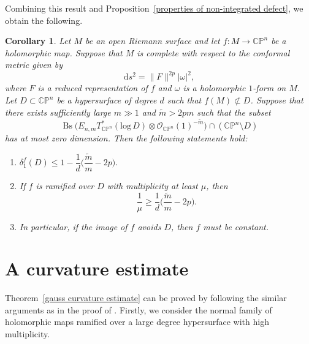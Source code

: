 \documentclass[english, 12pt]{amsart}
\DeclareMathOperator{\bs}{Bs}
\def\log{\mathrm{log}\,}
\theoremstyle{plain}
\newtheorem{cor}[thm]{{Corollary}}
\theoremstyle{remark}
\numberwithin{equation}{section}
\theoremstyle{plain}
\theoremstyle{named}
\begin{document}
Combining this result and Proposition~\ref{properties of non-integrated defect}, we obtain the following.
\begin{cor}
	\label{ramification gauss map}
	Let $M$ be an open Riemann surface and let $f\colon M\rightarrow\mathbb{CP}^n$ be a holomorphic map. Suppose that $M$ is complete with respect to  the conformal metric given by
	\[
	\mathrm{d}s^2=\|F\|^{2p}|\omega|^2,
	\]
	where $F$ is a reduced representation of $f$ and $\omega$ is a holomorphic $1$-form on $M$. Let $D\subset \mathbb{CP}^n$ be a hypersurface of degree $d$ such that $f(M)\not\subset D$.  Suppose that there exists sufficiently large $m\gg 1$ and $\tilde{m}>2pm$ such that the subset
	\[
	\bs	\big(
	E_{n,m}T_{\mathbb{C}\mathbb{P}^n}^*(\log D)
	\otimes
	\mathcal{O}_{\mathbb{C}\mathbb{P}^n}(1)^{-\widetilde{m}}
	\big)\cap \left(\mathbb{C}\mathbb{P}^n\setminus D\right)
	\]
	has at most zero dimension. Then the following statements hold:
	\begin{enumerate}
		\item $	\delta_1^f(D)\leq 1-\dfrac{1}{d}\bigg(\dfrac{\widetilde{m}}{m}-2p\bigg).$
		\item If $f$ is ramified over $D$ with multiplicity at least $\mu$, then
		\[
		\dfrac{1}{\mu}\geq\dfrac{1}{d}\bigg(\dfrac{\widetilde{m}}{m}-2p\bigg).
		\]
		\item In particular, if the image of $f$ avoids $D$, then $f$ must be constant.
	\end{enumerate}
	
\end{cor}

\section{A curvature estimate}
Theorem~\ref{gauss curvature estimate} can be proved by following the similar arguments as in the proof of \cite[Theorem 2]{Chen-Li-Liu-Ru21}.
Firstly, we consider the normal family of holomorphic maps ramified over a large degree hypersurface with high multiplicity.
\end{document}

